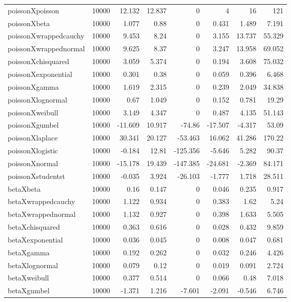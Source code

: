 \begin{table}[!htbp]
{\begin{tabular}{lrrrrrrr}
poissonXpoisson & 10000 & 12.132 & 12.837 & 0 & 4 & 16 & 121 \\ 
poissonXbeta & 10000 & 1.077 & 0.88 & 0 & 0.431 & 1.489 & 7.191 \\ 
poissonXwrappedcauchy & 10000 & 9.453 & 8.24 & 0 & 3.155 & 13.737 & 55.329 \\ 
poissonXwrappednormal & 10000 & 9.625 & 8.37 & 0 & 3.247 & 13.958 & 69.052 \\ 
poissonXchisquared & 10000 & 3.059 & 5.374 & 0 & 0.194 & 3.608 & 75.032 \\ 
poissonXexponential & 10000 & 0.301 & 0.38 & 0 & 0.059 & 0.396 & 6.468 \\ 
poissonXgamma & 10000 & 1.619 & 2.315 & 0 & 0.239 & 2.049 & 34.838 \\ 
poissonXlognormal & 10000 & 0.67 & 1.049 & 0 & 0.152 & 0.781 & 19.29 \\ 
poissonXweibull & 10000 & 3.149 & 4.347 & 0 & 0.487 & 4.135 & 51.143 \\ 
poissonXgumbel & 10000 & -11.609 & 10.917 & -74.86 & -17.507 & -4.317 & 53.09 \\ 
poissonXlaplace & 10000 & 30.341 & 20.127 & -53.463 & 16.062 & 41.286 & 170.22 \\ 
poissonXlogistic & 10000 & -0.184 & 12.81 & -125.356 & -5.646 & 5.282 & 90.37 \\ 
poissonXnormal & 10000 & -15.178 & 19.439 & -147.385 & -24.681 & -2.369 & 84.171 \\ 
poissonXstudentst & 10000 & -0.035 & 3.924 & -26.103 & -1.777 & 1.718 & 28.511 \\ 
betaXbeta & 10000 & 0.16 & 0.147 & 0 & 0.046 & 0.235 & 0.917 \\ 
betaXwrappedcauchy & 10000 & 1.122 & 0.934 & 0 & 0.383 & 1.62 & 5.24 \\ 
betaXwrappednormal & 10000 & 1.132 & 0.927 & 0 & 0.398 & 1.633 & 5.505 \\ 
betaXchisquared & 10000 & 0.363 & 0.616 & 0 & 0.028 & 0.432 & 9.859 \\ 
betaXexponential & 10000 & 0.036 & 0.045 & 0 & 0.008 & 0.047 & 0.681 \\ 
betaXgamma & 10000 & 0.192 & 0.262 & 0 & 0.032 & 0.246 & 4.426 \\ 
betaXlognormal & 10000 & 0.079 & 0.12 & 0 & 0.019 & 0.091 & 2.724 \\ 
betaXweibull & 10000 & 0.377 & 0.514 & 0 & 0.066 & 0.48 & 7.018 \\ 
betaXgumbel & 10000 & -1.371 & 1.216 & -7.601 & -2.091 & -0.546 & 6.746 \\ 

\end{tabular}}
\end{table}
